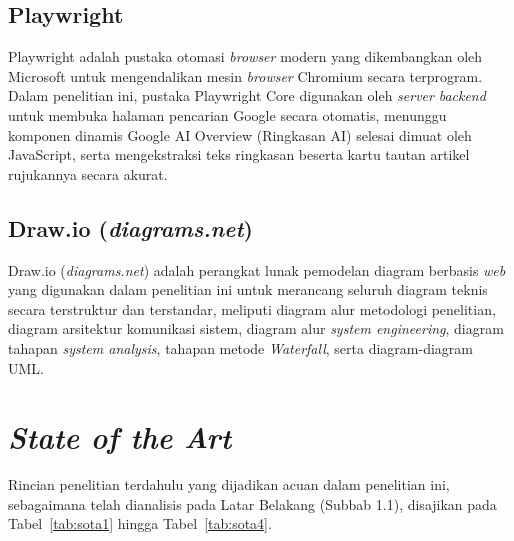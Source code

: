 \documentclass[12pt,a4paper,twoside]{report}
\begin{document}
\subsection{Playwright}

Playwright adalah pustaka otomasi \textit{browser} modern yang dikembangkan oleh Microsoft untuk mengendalikan mesin \textit{browser} Chromium secara terprogram. Dalam penelitian ini, pustaka Playwright Core digunakan oleh \textit{server} \textit{backend} untuk membuka halaman pencarian Google secara otomatis, menunggu komponen dinamis Google AI Overview (Ringkasan AI) selesai dimuat oleh JavaScript, serta mengekstraksi teks ringkasan beserta kartu tautan artikel rujukannya secara akurat.

\subsection{Draw.io (\textit{diagrams.net})}

Draw.io (\textit{diagrams.net}) adalah perangkat lunak pemodelan diagram berbasis \textit{web} yang digunakan dalam penelitian ini untuk merancang seluruh diagram teknis secara terstruktur dan terstandar, meliputi diagram alur metodologi penelitian, diagram arsitektur komunikasi sistem, diagram alur \textit{system engineering}, diagram tahapan \textit{system analysis}, tahapan metode \textit{Waterfall}, serta diagram-diagram UML.

\section{\textit{State of the Art}}

Rincian penelitian terdahulu yang dijadikan acuan dalam penelitian ini, sebagaimana telah dianalisis pada Latar Belakang (Subbab 1.1), disajikan pada Tabel~\ref{tab:sota1} hingga Tabel~\ref{tab:sota4}.
\end{document}
